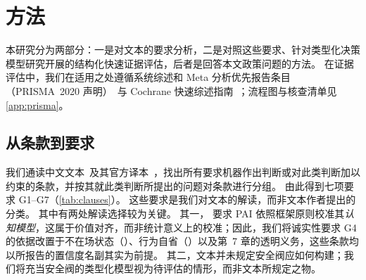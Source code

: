 \section{方法}
\label{sec:method}

本研究分为两部分：一是对\pol{}文本的要求分析，二是对照这些要求、针对类型化决策模型研究开展的结构化快速证据评估，后者是回答本文政策问题的方法。
在证据评估中，我们在适用之处遵循系统综述和 Meta 分析优先报告条目（PRISMA~2020 声明）~\cite{page2021prisma}与 Cochrane 快速综述指南~\cite{garritty2021cochrane}；流程图与核查清单见\cref{app:prisma}。

\subsection{从条款到要求}
\label{sec:requirements}

我们通读中文文本~\cite{pol2text}及其官方译本~\cite{pol2en}，找出所有要求机器作出判断或对此类判断加以约束的条款，并按其就此类判断所提出的问题对条款进行分组。
由此得到七项要求 G1--G7（\cref{tab:clauses}）。
这些要求是我们对文本的解读，而非文本作者提出的分类。
其中有两处解读选择较为关键。
其一， 要求 PAI 依照框架原则校准其\emph{认知模型}，这属于价值对齐，而非统计意义上的校准；因此，我们将诚实性要求 G4 的依据改置于不在场状态（）、行为自省（）以及第~7 章的透明义务，这些条款均以所报告的置信度名副其实为前提。
其二，文本并未规定安全阀应如何构建；我们将充当安全阀的类型化模型视为待评估的情形，而非文本所规定之物。

